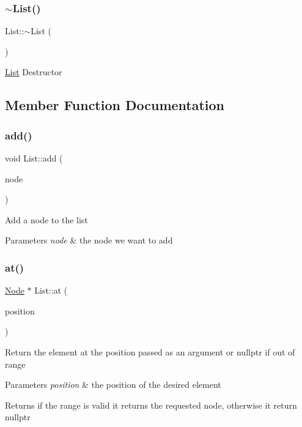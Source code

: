\subsubsection{\texorpdfstring{$\sim$\+List()}{~List()}}
{\footnotesize\ttfamily List\+::$\sim$\+List (\begin{DoxyParamCaption}{ }\end{DoxyParamCaption})\hspace{0.3cm}{\ttfamily [virtual]}}

\hyperlink{classList}{List} Destructor 

\subsection{Member Function Documentation}
\mbox{\label{classList_ad5dc568900ee2069c7fcbf813aeeeead}} 
\subsubsection{\texorpdfstring{add()}{add()}}
{\footnotesize\ttfamily void List\+::add (\begin{DoxyParamCaption}\item[{\hyperlink{classNode}{Node} $\ast$}]{node }\end{DoxyParamCaption})}

Add a node to the list 
\begin{DoxyParams}{Parameters}
{\em node} & the node we want to add \\
\hline
\end{DoxyParams}
\mbox{\label{classList_a7c79ecd4f068f6cde918941ad276e842}} 
\subsubsection{\texorpdfstring{at()}{at()}}
{\footnotesize\ttfamily \hyperlink{classNode}{Node} $\ast$ List\+::at (\begin{DoxyParamCaption}\item[{int}]{position }\end{DoxyParamCaption})}

Return the element at the position passed as an argument or nullptr if out of range 
\begin{DoxyParams}{Parameters}
{\em position} & the position of the desired element \\
\hline
\end{DoxyParams}
\begin{DoxyReturn}{Returns}
if the range is valid it returns the requested node, otherwise it return nullptr 
\end{DoxyReturn}
\mbox{\label{classList_a2daf0ff93100ed732fc655f7e2af1ae9}} 
